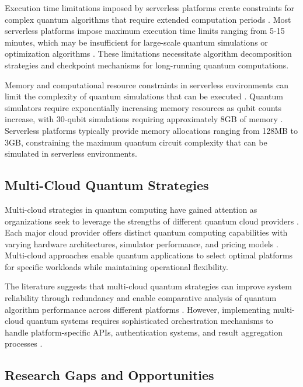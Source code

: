 \documentclass[onecolumn]{IEEEtran}
\begin{document}
Execution time limitations imposed by serverless platforms create constraints for complex quantum algorithms that require extended computation periods \cite{spillner2017faas}. Most serverless platforms impose maximum execution time limits ranging from 5-15 minutes, which may be insufficient for large-scale quantum simulations or optimization algorithms \cite{castro2019serverless}. These limitations necessitate algorithm decomposition strategies and checkpoint mechanisms for long-running quantum computations.

Memory and computational resource constraints in serverless environments can limit the complexity of quantum simulations that can be executed \cite{eismann2020review}. Quantum simulators require exponentially increasing memory resources as qubit counts increase, with 30-qubit simulations requiring approximately 8GB of memory \cite{preskill2018}. Serverless platforms typically provide memory allocations ranging from 128MB to 3GB, constraining the maximum quantum circuit complexity that can be simulated in serverless environments.

\subsection{Multi-Cloud Quantum Strategies}

Multi-cloud strategies in quantum computing have gained attention as organizations seek to leverage the strengths of different quantum cloud providers \cite{leymann2020quantum}. Each major cloud provider offers distinct quantum computing capabilities with varying hardware architectures, simulator performance, and pricing models \cite{fingerhuth2018open}. Multi-cloud approaches enable quantum applications to select optimal platforms for specific workloads while maintaining operational flexibility.

The literature suggests that multi-cloud quantum strategies can improve system reliability through redundancy and enable comparative analysis of quantum algorithm performance across different platforms \cite{preskill2018}. However, implementing multi-cloud quantum systems requires sophisticated orchestration mechanisms to handle platform-specific APIs, authentication systems, and result aggregation processes \cite{cerezo2021}.

\subsection{Research Gaps and Opportunities}
\end{document}
